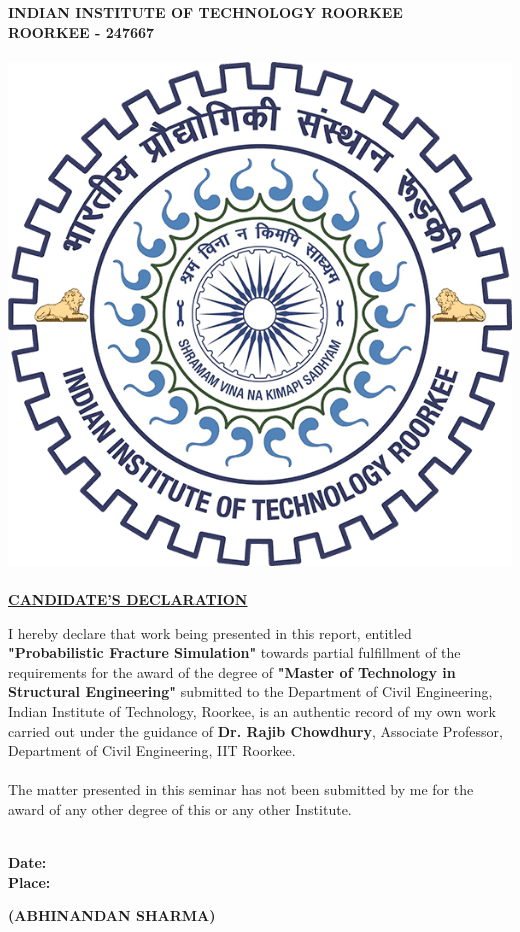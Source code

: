 \documentclass[12pt]{article}
\begin{document}
{%
\begin{center}
\textbf{ \LARGE   INDIAN INSTITUTE OF TECHNOLOGY ROORKEE\\
ROORKEE - 247667\\~\\
\includegraphics[width=.3\textwidth]{iitr.png}\\~\\
\underline{CANDIDATE'S DECLARATION}\\}
\end{center}
\begin{doublespace}
    {\large I hereby declare that work being presented 
    in this report, entitled \textbf{\large "Probabilistic 
    Fracture Simulation"} 
    towards partial fulfillment of the requirements for the 
    award of the degree of \textbf{\large "Master of Technology in Structural Engineering"}
    submitted to
    the Department of Civil Engineering, 
    Indian Institute of Technology, Roorkee, is an authentic
    record of my own work carried out under the 
    guidance of \textbf{Dr. Rajib Chowdhury}, Associate
    Professor, Department of Civil Engineering, IIT Roorkee.\\~\\
    The matter presented in this seminar has 
    not been submitted by me for the award of any other
    degree of this or any other Institute. \\~\\
    }    
\end{doublespace}
\begin{minipage}[t]{7cm}\bf
\flushleft
Date:\\Place:\\
\end{minipage}
\hfill
\begin{minipage}[t]{7cm}\bf
\flushright
(ABHINANDAN SHARMA)\\
\end{minipage}
\\~\\
\begin{center}\bf

\end{center}}
\end{document}
